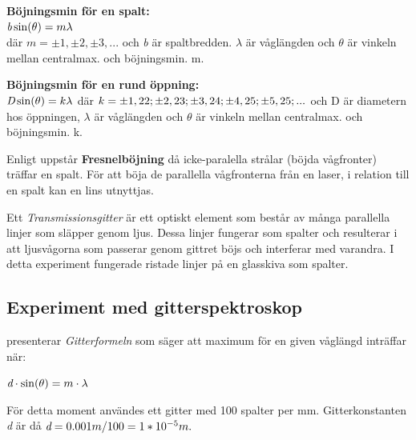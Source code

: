 \documentclass[conference]{IEEEtran}
\begin{document}
\textbf{Böjningsmin för en spalt: \\}
\begin{math} 
\emph{b}\sin(\theta) = m\lambda
\end{math}\\
där $ m = \pm{1}, \pm{2}, \pm{3},...$ och \emph{b} är spaltbredden. $\lambda$ är våglängden och $\theta$ är vinkeln mellan centralmax. och böjningsmin. m.
\vspace{12pt}

\textbf{Böjningsmin för en rund öppning: \\}
\begin{math}
\emph{D}\sin(\theta) = k\lambda\\
\end{math}
där $ k = \pm{1, 22}; \pm{2, 23}; \pm{3, 24}; \pm{4, 25}; \pm{5, 25}; ...\\
$ och D är diametern hos öppningen, $\lambda$ är våglängden och $\theta$ är vinkeln mellan centralmax. och böjningsmin. k.
 \vspace{12pt}

Enligt \cite{Fraunhofer} uppstår \textbf{Fresnelböjning} då icke-paralella strålar (böjda vågfronter) träffar en spalt. För att böja de parallella vågfronterna från en laser, i relation till en spalt kan en lins utnyttjas.

Ett \emph{Transmissionsgitter} är ett optiskt element som består av många parallella linjer som släpper genom ljus. Dessa linjer fungerar som spalter och resulterar i att ljusvågorna som passerar genom gittret böjs och interferar med varandra. I detta experiment fungerade ristade linjer på en glasskiva som spalter.

\subsection{Experiment med gitterspektroskop}

\cite{Handledningen} presenterar \emph{Gitterformeln} som säger att maximum för en given våglängd inträffar när: 

\begin{math}
\emph{d} \cdot \sin(\theta) = m \cdot \lambda
\end{math}
 \vspace{12pt}
 
För detta moment användes ett gitter med 100 spalter per mm. Gitterkonstanten \emph{d} är då 
\begin{math}
\emph{d} = 0.001m/100 = 1 * 10^{-5} m.
\end{math}
\end{document}
